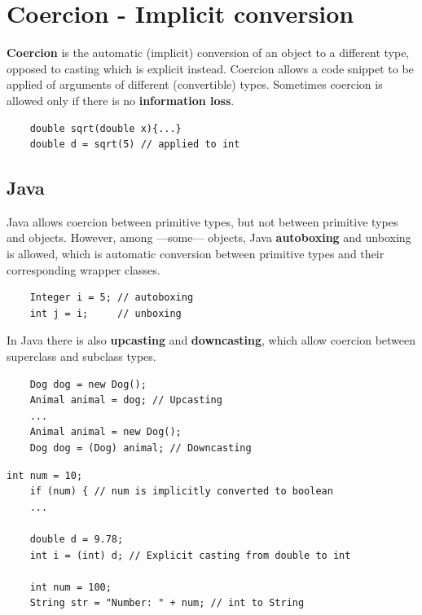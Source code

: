 \lstset{style=javaBlockAnn}
\section{Coercion - Implicit conversion}
\textbf{Coercion} is the automatic (implicit) conversion of an object to a different type, opposed to casting which is explicit instead.
Coercion allows a code snippet to be applied of arguments of different (convertible) types.
Sometimes coercion is allowed only if there is no \textbf{information loss}.

\begin{lstlisting}
    double sqrt(double x){...}
    double d = sqrt(5) // applied to int
\end{lstlisting}

\subsection{Java}
Java allows coercion between primitive types, but not between primitive types and objects.
However, among ---some--- objects, Java \textbf{autoboxing} and unboxing is allowed, which is automatic conversion between primitive types and their corresponding wrapper classes.
\begin{lstlisting}
    Integer i = 5; // autoboxing
    int j = i;     // unboxing
\end{lstlisting}

In Java there is also \textbf{upcasting} and \textbf{downcasting}, which allow coercion between superclass and subclass types.
\begin{lstlisting}
    Dog dog = new Dog();
    Animal animal = dog; // Upcasting
    ...
    Animal animal = new Dog();
    Dog dog = (Dog) animal; // Downcasting
\end{lstlisting}

\begin{lstlisting}[caption={Other examples of coercion in Java},captionpos=t]
    int num = 10;
    if (num) { // num is implicitly converted to boolean
    ...

    double d = 9.78;
    int i = (int) d; // Explicit casting from double to int

    int num = 100;
    String str = "Number: " + num; // int to String
\end{lstlisting}

